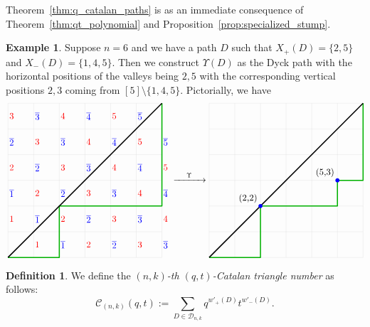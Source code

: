 \documentclass[11pt, leqno]{amsart}
\theoremstyle{plain}
\theoremstyle{definition}
\newtheorem{definition}[theorem]{Definition}
\newtheorem{example}[theorem]{Example}
\numberwithin{equation}{section}
\newcommand{\seteq}{\mathbin{:=}}
\newcommand{\Cat}{\mathcal{C}} %
\newcommand{\Dyck}{\mathcal{D}} %
\newcommand{\ofour}{\overline{4}}
\newcommand{\othree}{\overline{3}}
\newcommand{\otwo}{\overline{2}}
\newcommand{\one}{\overline{1}}
\newcommand{\defn}[1]{{\color{darkred}\emph{#1}}} %
\begin{document}
Theorem~\ref{thm:q_catalan_paths} is as an immediate consequence of Theorem~\ref{thm:qt_polynomial} and Proposition~\ref{prop:specialized_stump}.

\begin{example}
Suppose $n = 6$ and we have a path $D$ such that $X_+(D) = \{2, 5\}$ and $X_-(D) = \{1, 4, 5\}$. Then we construct $\Upsilon(D)$ as the Dyck path with the horizontal positions of the valleys being $2, 5$ with the corresponding vertical positions $2, 3$ coming from $[5] \setminus \{1, 4, 5\}$. Pictorially, we have
\[
\begin{tikzpicture}[scale=1,baseline=83pt]
\draw[gray!40,very thin] (0,0) grid (6,6);
\foreach \i in {0,...,2} \draw (2-\i,\i+0.5) node[right=-2pt,blue] {$\one$};
\foreach \i in {0,...,4} \draw (4-\i,\i+0.5) node[right=-2pt,blue] {$\otwo$};
\foreach \i in {0,...,5} \draw (6-\i,\i+0.5) node[right=-2pt,blue] {$\othree$};
\foreach \i in {0,...,3} \draw (6-\i,\i+2.5) node[right=-2pt,blue] {$\ofour$};
\foreach \i in {0,...,1} \draw (6-\i,\i+4.5) node[right=-2pt,blue] {$\overline{5}$};
\foreach \i in {0,1} \draw (1-\i,\i+0.5) node[right=-2pt,red] {$1$};
\foreach \i in {0,...,3} \draw (3-\i,\i+0.5) node[right=-2pt,red] {$2$};
\foreach \i in {0,...,5} \draw (5-\i,\i+0.5) node[right=-2pt,red] {$3$};
\foreach \i in {0,...,4} \draw (6-\i,\i+1.5) node[right=-2pt,red] {$4$};
\foreach \i in {0,...,2} \draw (6-\i,\i+3.5) node[right=-2pt,red] {$5$};
\draw[-, very thick, black!30!green,line join=round] (0,0) -- (2,0) -- (2,2) -- (6,2) -- (6,6);
\draw[-, very thick] (0,0) -- (6,6);
\end{tikzpicture}
\xrightarrow[\hspace{30pt}]{\Upsilon}
\begin{tikzpicture}[scale=1,baseline=83pt]
\draw[gray!40,very thin] (0,0) grid (6,6);
\draw[-, very thick, black!30!green, line join=round] (0,0) -- (2,0) -- (2,2) -- (5,2) -- (5,3) -- (6,3) -- (6,6);
\draw[-, very thick] (0,0) -- (6,6);
\fill[blue] (2,2) circle (0.08) node[anchor=south east, black] {(2,2)};
\fill[blue] (5,3) circle (0.08) node[anchor=south east, black] {(5,3)};
\end{tikzpicture}
\]
\end{example}

\begin{definition}
\label{def:qt_Catalan_triangle}
We define the \defn{$(n,k)$-th $(q,t)$-Catalan triangle number} as follows:
\[
\Cat_{(n,k)}(q,t) \seteq \sum_{D \in \Dyck_{n,k}} q^{w'_+(D)} t^{w'_-(D)}.
\]
\end{definition}
\end{document}
